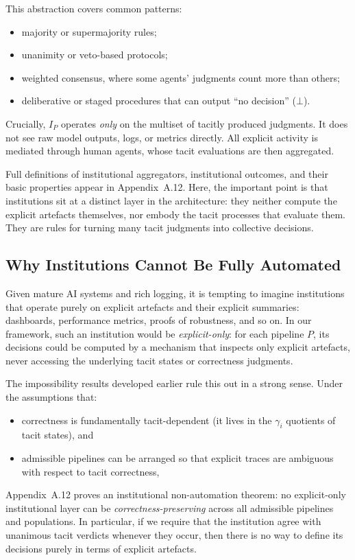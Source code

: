 This abstraction covers common patterns:
\begin{itemize}
  \item majority or supermajority rules;
  \item unanimity or veto-based protocols;
  \item weighted consensus, where some agents' judgments count more than others;
  \item deliberative or staged procedures that can output ``no decision'' ($\bot$).
\end{itemize}

Crucially, $I_P$ operates \emph{only} on the multiset of tacitly produced judgments. It does not see raw model outputs, logs, or metrics directly. All explicit activity is mediated through human agents, whose tacit evaluations are then aggregated.

Full definitions of institutional aggregators, institutional outcomes, and their basic properties appear in Appendix~A.12. Here, the important point is that institutions sit at a distinct layer in the architecture: they neither compute the explicit artefacts themselves, nor embody the tacit processes that evaluate them. They are rules for turning many tacit judgments into collective decisions.

\subsection{Why Institutions Cannot Be Fully Automated}

Given mature AI systems and rich logging, it is tempting to imagine institutions that operate purely on explicit artefacts and their explicit summaries: dashboards, performance metrics, proofs of robustness, and so on. In our framework, such an institution would be \emph{explicit-only}: for each pipeline $P$, its decisions could be computed by a mechanism that inspects only explicit artefacts, never accessing the underlying tacit states or correctness judgments.

The impossibility results developed earlier rule this out in a strong sense. Under the assumptions that:
\begin{itemize}
  \item correctness is fundamentally tacit-dependent (it lives in the $\gamma_i$ quotients of tacit states), and
  \item admissible pipelines can be arranged so that explicit traces are ambiguous with respect to tacit correctness,
\end{itemize}
Appendix~A.12 proves an institutional non-automation theorem: no explicit-only institutional layer can be \emph{correctness-preserving} across all admissible pipelines and populations. In particular, if we require that the institution agree with unanimous tacit verdicts whenever they occur, then there is no way to define its decisions purely in terms of explicit artefacts.

